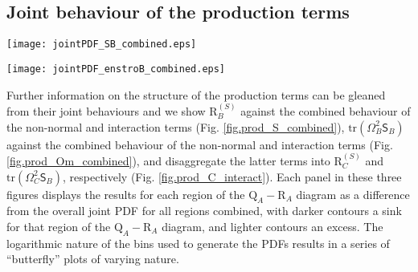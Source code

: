 \documentclass[preprint,amssymb,amsmath,aip,cha]{revtex4-1}
\begin{document}
\subsection{Joint behaviour of the production terms}

\begin{figure*}
  \texttt{[image: jointPDF\_SB\_combined.eps]}
\caption{Joint probability distributions (on $\mbox{log}_{10}$ axes) for $\mbox{R}_{B}^{(S)}$ and the combined non-normal and interaction terms conditioned on the region of the $Q_{A}-R_{A}$ diagram, and written as the difference between the distribution in this region and the overall distributions function. Positive values indicate an excess for this region and have the lighter probability contours. Contours are in intervals of $2.5 \times 10^{-4}$ ranging from $2.5 \times 10^{-4} \le |p| \le 1.0 \times 10^{-3}$.}
\label{fig.prod_S_combined}       %
\end{figure*}

\begin{figure*}
  \texttt{[image: jointPDF\_enstroB\_combined.eps]}
\caption{Joint probability distributions (on $\mbox{log}_{10}$ axes) for $\mbox{tr}(\mathsf{\Omega}^{2}_{B}\mathsf{S}_{B})$ and the combined non-normal and interaction terms conditioned on the region of the $Q_{A}-R_{A}$ diagram, and written as the difference between the distribution in this region and the overall distributions function. Positive values indicate an excess for this region and have the lighter probability contours. Contours are in intervals of $2.5 \times 10^{-4}$ ranging from $2.5 \times 10^{-4} \le |p| \le 1.0 \times 10^{-3}$.}
\label{fig.prod_Om_combined}       %
\end{figure*}

Further information on the structure of the production terms can be gleaned from their joint behaviours and we show $\mbox{R}_{B}^{(S)}$ against the combined behaviour of the non-normal and interaction terms (Fig. \ref{fig.prod_S_combined}), $\mbox{tr}(\mathsf{\Omega}^{2}_{B}\mathsf{S}_{B})$ against the combined behaviour of the non-normal and interaction terms (Fig. \ref{fig.prod_Om_combined}), and disaggregate the latter terms into $\mbox{R}_{C}^{(S)}$ and $\mbox{tr}(\mathsf{\Omega}^{2}_{C}\mathsf{S}_{B})$, respectively (Fig. \ref{fig.prod_C_interact}). Each panel in these three figures displays the results for each region of the $\mbox{Q}_{A}-\mbox{R}_{A}$ diagram as a difference from the overall joint PDF for all regions combined, with darker contours a sink for that region of the $\mbox{Q}_{A}-\mbox{R}_{A}$ diagram, and lighter contours an excess. The logarithmic nature of the bins used to generate the PDFs results in a series of ``butterfly'' plots of varying nature. 
\end{document}
